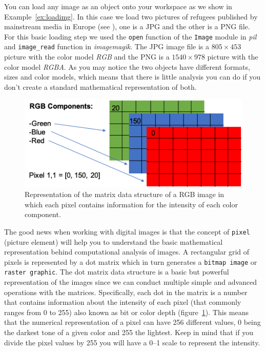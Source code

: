 You can load any image as an object onto your workspace as we show in Example~\ref{ex:loadimg}. In this case we load two pictures of refugees published by mainstream media in Europe (see \citet{amores2019visual}), one is a JPG and the other is a PNG file. For this basic loading step we used the \texttt{open} function of the \texttt{Image} module in \emph{pil} and \texttt{image\_read} function in \emph{imagemagik}. The JPG image file is a $805\times 453$ picture with the color model \textit{RGB} and the PNG is a $1540\times 978$ picture with the color model \textit{RGBA}. As you may notice the two objects have different formats, sizes and color models, which means that there is little analysis you can do if you don't create a standard mathematical representation of both.


\begin{figure}
\centering
\includegraphics[width=0.9\linewidth]{figures/ch15_pixel.png}
\caption{Representation of the matrix data structure of a RGB image in which each pixel contains information for the intensity of each color component.}
\label{fig:pixel}
\end{figure}

The good news when working with digital images is that the concept of \texttt{pixel} (picture element) will help you to understand the basic mathematical representation behind computational analysis of images. A rectangular grid of pixels is represented by a dot matrix which in turn generates a \texttt{bitmap image} or \texttt{raster graphic}. The dot matrix data structure is a basic but powerful representation of the images since we can conduct multiple simple and advanced operations with the matrices. Specifically, each dot in the matrix is a number that contains information about the intensity of each pixel (that commonly ranges from 0 to 255) also known as bit or color depth (figure~\ref{fig:pixel}). This means that the numerical representation of a pixel can have 256 different values, 0 being the darkest tone of a given color and 255 the lightest. Keep in mind that if you divide the pixel values by 255 you will have a 0--1 scale to represent the intensity.

